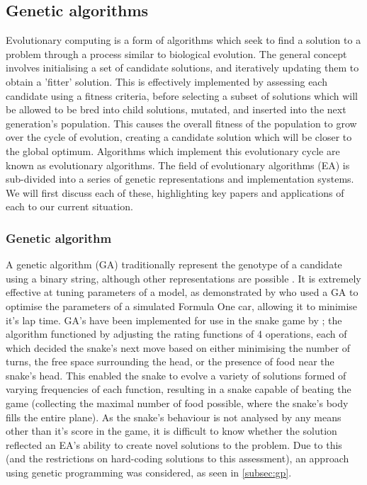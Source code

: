 \documentclass[british,10pt,a4paper]{article}
\begin{document}
\subsection{Genetic algorithms}
Evolutionary computing is a form of algorithms which seek to find a solution to a problem through a process similar to biological evolution. \cite{Ashlock_undated-vx} The general concept involves initialising a set of candidate solutions, and iteratively updating them to obtain a 'fitter' solution. This is effectively implemented by assessing each candidate using a fitness criteria, before selecting a subset of solutions which will be allowed to be bred into child solutions, mutated, and inserted into the next generation's population. This causes the overall fitness of the population to grow over the cycle of evolution, creating a candidate solution which will be closer to the global optimum. Algorithms which implement this evolutionary cycle are known as evolutionary algorithms. The field of evolutionary algorithms (EA) is sub-divided into a series of genetic representations and implementation systems. We will first discuss each of these, highlighting key papers and applications of each to our current situation.

\subsubsection{Genetic algorithm}
A genetic algorithm (GA) traditionally represent the genotype of a candidate using a binary string, although other representations are possible \cite{Whitley1994-tx}. It is extremely effective at tuning parameters of a model, as demonstrated by \citet{Wloch2004-vo} who used a GA to optimise the parameters of a simulated Formula One car, allowing it to minimise it's lap time. GA's have been implemented for use in the snake game by \citet{Yeh2016-ts}; the algorithm functioned by adjusting the rating functions of 4 operations, each of which decided the snake's next move based on either minimising the number of turns, the free space surrounding the head, or the presence of food near the snake's head. This enabled the snake to evolve a variety of solutions formed of varying frequencies of each function, resulting in a snake capable of beating the game (collecting the maximal number of food possible, where the snake's body fills the entire plane). As the snake's behaviour is not analysed by any means other than it's score in the game, it is difficult to know whether the solution reflected an EA's ability to create novel solutions to the problem. Due to this (and the restrictions on hard-coding solutions to this assessment), an approach using genetic programming was considered, as seen in \autoref{subsec:gp}.
\end{document}
